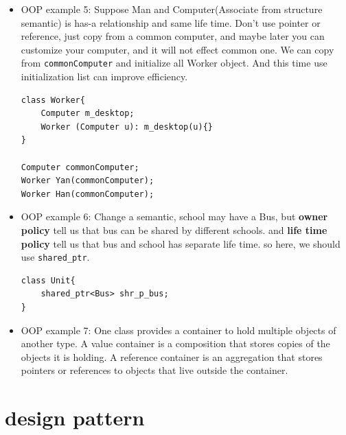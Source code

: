 \documentclass[a4paper,11pt,twoside]{book}
\begin{document}
\begin{itemize}
	\item OOP example 5: Suppose Man and Computer(Associate from structure semantic) is has-a relationship and same life time. Don't use pointer or reference, just copy from a common computer, and maybe later you can customize your computer, and it will not effect common one.  We can copy from \texttt{commonComputer} and initialize all Worker object.  And this time use initialization list can improve efficiency.
\begin{lstlisting}[numbers=none]
class Worker{
	Computer m_desktop;
	Worker (Computer u): m_desktop(u){}
}
	
Computer commonComputer;
Worker Yan(commonComputer);
Worker Han(commonComputer);
\end{lstlisting}
	
	
	\item OOP example 6:  Change a semantic,  school may have a Bus, but \textbf{owner policy} tell us that bus can be shared by different schools. and \textbf{life time policy} tell us that bus and school has separate life time. so here, we should use \texttt{shared\_ptr}.
\begin{lstlisting}[numbers=none]
class Unit{
	shared_ptr<Bus> shr_p_bus;
}
\end{lstlisting}
	
	\item OOP example 7: One class provides a container to hold multiple objects of another type. A value container is a composition that stores copies of the objects it is holding. A reference container is an aggregation that stores pointers or references to objects that live outside the container.
	
\end{itemize}


\section{design pattern}
\end{document}
